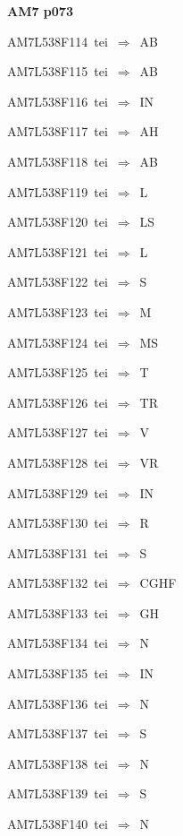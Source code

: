 \par\vfill\eject
{\bf\hfill AM7 p073\hfill\hbox{}}\par\bigskip
{\sixrm AM7L538F114\ {\sixit tei}\ }$\Rightarrow$\ AB\par\smallskip
{\sixrm AM7L538F115\ {\sixit tei}\ }$\Rightarrow$\ AB\par\smallskip
{\sixrm AM7L538F116\ {\sixit tei}\ }$\Rightarrow$\ IN\par\smallskip
{\sixrm AM7L538F117\ {\sixit tei}\ }$\Rightarrow$\ AH\par\smallskip
{\sixrm AM7L538F118\ {\sixit tei}\ }$\Rightarrow$\ AB\par\smallskip
{\sixrm AM7L538F119\ {\sixit tei}\ }$\Rightarrow$\ L\par\smallskip
{\sixrm AM7L538F120\ {\sixit tei}\ }$\Rightarrow$\ LS\par\smallskip
{\sixrm AM7L538F121\ {\sixit tei}\ }$\Rightarrow$\ L\par\smallskip
{\sixrm AM7L538F122\ {\sixit tei}\ }$\Rightarrow$\ S\par\smallskip
{\sixrm AM7L538F123\ {\sixit tei}\ }$\Rightarrow$\ M\par\smallskip
{\sixrm AM7L538F124\ {\sixit tei}\ }$\Rightarrow$\ MS\par\smallskip
{\sixrm AM7L538F125\ {\sixit tei}\ }$\Rightarrow$\ T\par\smallskip
{\sixrm AM7L538F126\ {\sixit tei}\ }$\Rightarrow$\ TR\par\smallskip
{\sixrm AM7L538F127\ {\sixit tei}\ }$\Rightarrow$\ V\par\smallskip
{\sixrm AM7L538F128\ {\sixit tei}\ }$\Rightarrow$\ VR\par\smallskip
{\sixrm AM7L538F129\ {\sixit tei}\ }$\Rightarrow$\ IN\par\smallskip
{\sixrm AM7L538F130\ {\sixit tei}\ }$\Rightarrow$\ R\par\smallskip
{\sixrm AM7L538F131\ {\sixit tei}\ }$\Rightarrow$\ S\par\smallskip
{\sixrm AM7L538F132\ {\sixit tei}\ }$\Rightarrow$\ CGHF\par\smallskip
{\sixrm AM7L538F133\ {\sixit tei}\ }$\Rightarrow$\ GH\par\smallskip
{\sixrm AM7L538F134\ {\sixit tei}\ }$\Rightarrow$\ N\par\smallskip
{\sixrm AM7L538F135\ {\sixit tei}\ }$\Rightarrow$\ IN\par\smallskip
{\sixrm AM7L538F136\ {\sixit tei}\ }$\Rightarrow$\ N\par\smallskip
{\sixrm AM7L538F137\ {\sixit tei}\ }$\Rightarrow$\ S\par\smallskip
{\sixrm AM7L538F138\ {\sixit tei}\ }$\Rightarrow$\ N\par\smallskip
{\sixrm AM7L538F139\ {\sixit tei}\ }$\Rightarrow$\ S\par\smallskip
{\sixrm AM7L538F140\ {\sixit tei}\ }$\Rightarrow$\ N\par\smallskip

